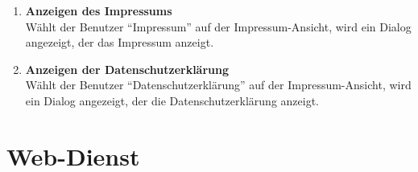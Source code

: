 \begin{enumerate}
\item \label{fa:imprAnzeigen}\textbf{Anzeigen des Impressums} \hfill \\
Wählt der Benutzer ``Impressum'' auf der Impressum-Ansicht, wird ein Dialog angezeigt, der das Impressum anzeigt.

\item \label{fa:datenschAnzeigen}\textbf{Anzeigen der Datenschutzerklärung} \hfill \\
Wählt der Benutzer ``Datenschutzerklärung'' auf der Impressum-Ansicht, wird ein Dialog angezeigt, der die Datenschutzerklärung anzeigt.

\end{enumerate}




\section{\gls{Web-Dienst}}
